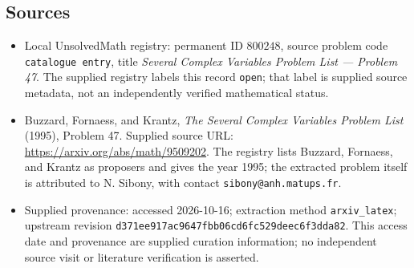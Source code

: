 \documentclass[11pt]{article}
\begin{document}
\subsection{Sources}
\begin{itemize}
\item Local UnsolvedMath registry: permanent ID \(800248\), source problem code \texttt{catalogue entry}, title \emph{Several Complex Variables Problem List --- Problem 47}. The supplied registry labels this record \texttt{open}; that label is supplied source metadata, not an independently verified mathematical status.
\item Buzzard, Fornaess, and Krantz, \emph{The Several Complex Variables Problem List} (1995), Problem 47. Supplied source URL: \url{https://arxiv.org/abs/math/9509202}. The registry lists Buzzard, Fornaess, and Krantz as proposers and gives the year 1995; the extracted problem itself is attributed to N. Sibony, with contact \texttt{sibony@anh.matups.fr}.
\item Supplied provenance: accessed 2026-10-16; extraction method \texttt{arxiv\_latex}; upstream revision \texttt{d371ee917ac9647fbb06cd6fc529deec6f3dda82}. This access date and provenance are supplied curation information; no independent source visit or literature verification is asserted.
\end{itemize}
\end{document}
